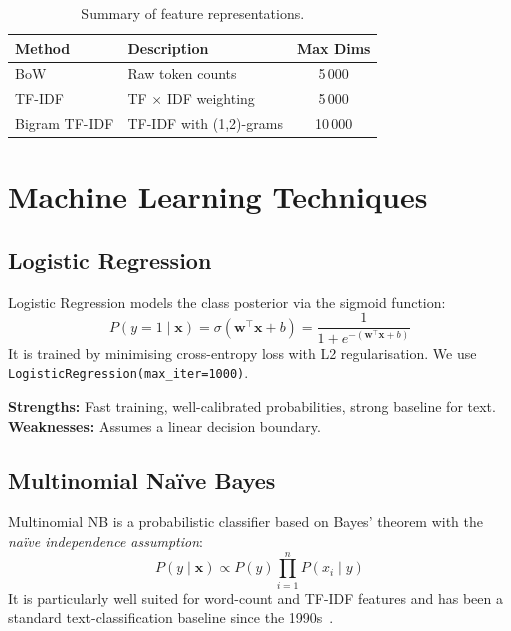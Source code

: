 \documentclass[conference, 10pt]{IEEEtran}
\begin{document}
\begin{table}[h]
\centering
\caption{Summary of feature representations.}
\label{tab:features}
\begin{tabular}{llc}
\toprule
\textbf{Method} & \textbf{Description} & \textbf{Max Dims} \\
\midrule
BoW             & Raw token counts              & 5\,000  \\
TF-IDF          & TF $\times$ IDF weighting     & 5\,000  \\
Bigram TF-IDF   & TF-IDF with (1,2)-grams       & 10\,000 \\
\bottomrule
\end{tabular}
\end{table}


\section{Machine Learning Techniques}
\label{sec:models}

\subsection{Logistic Regression}

Logistic Regression models the class posterior via the sigmoid function:
\begin{equation}
P(y=1 \mid \mathbf{x}) = \sigma(\mathbf{w}^{\top}\mathbf{x} + b) = \frac{1}{1 + e^{-(\mathbf{w}^{\top}\mathbf{x} + b)}}
\end{equation}
It is trained by minimising cross-entropy loss with L2 regularisation.
We use \texttt{LogisticRegression(max\_iter=1000)}.

\textbf{Strengths:} Fast training, well-calibrated probabilities, strong baseline for text.\\
\textbf{Weaknesses:} Assumes a linear decision boundary.

\subsection{Multinomial Na\"ive Bayes}

Multinomial NB is a probabilistic classifier based on Bayes' theorem with the \emph{na\"ive independence assumption}:
\begin{equation}
P(y \mid \mathbf{x}) \propto P(y) \prod_{i=1}^{n} P(x_i \mid y)
\end{equation}
It is particularly well suited for word-count and TF-IDF features and has been a standard text-classification baseline since the 1990s~\cite{mccallum1998}.
\end{document}
